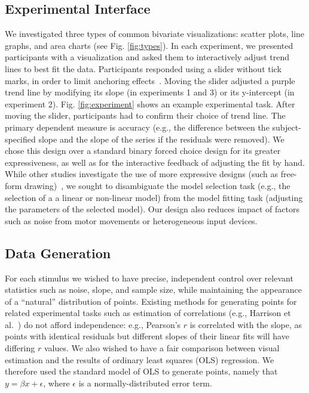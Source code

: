 \documentclass{sigchi}
\begin{document}
\subsection{Experimental Interface}
\typesFig

We investigated three types of common bivariate visualizations: scatter plots, line graphs, and area charts (see Fig. \ref{fig:types}). In each experiment, we presented participants with a visualization and asked them to interactively adjust trend lines to best fit the data.  Participants responded using a slider without tick marks, in order to limit anchoring effects~\cite{matejka2016effect}. Moving the slider adjusted a purple trend line by modifying its slope (in experiments 1 and 3) or its y-intercept (in experiment 2). Fig. \ref{fig:experiment} shows an example experimental task. After moving the slider, participants had to confirm their choice of trend line. The primary dependent measure is accuracy (e.g., the difference between the subject-specified slope and the slope of the series if the residuals were removed). We chose this design over a standard binary forced choice design for its greater expressiveness, as well as for the interactive feedback of adjusting the fit by hand. While other studies investigate the use of more expressive designs (such as free-form drawing)~\cite{kim2017}, we sought to disambiguate the model selection task (e.g., the selection of a a linear or non-linear model) from the model fitting task (adjusting the parameters of the selected model). Our design also reduces impact of factors such as noise from motor movements or heterogeneous input devices.

\subsection{Data Generation}

\sigmasFig

\trendtypesFig

For each stimulus we wished to have precise, independent control over relevant statistics such as noise, slope, and sample size, while maintaining the appearance of a ``natural'' distribution of points. Existing methods for generating points for related experimental tasks such as estimation of correlations (e.g., Harrison et al.~\cite{harrison2014ranking}) do not afford independence: e.g., Pearson's $r$ is correlated with the slope, as points with identical residuals but different slopes of their linear fits will have differing $r$ values. We also wished to have a fair comparison between visual estimation and the results of ordinary least squares (OLS) regression. We therefore used the standard model of OLS to generate points, namely that $y=\beta x + \epsilon$, where $\epsilon$ is a normally-distributed error term.
\end{document}
